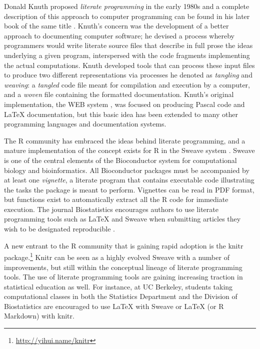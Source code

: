 \documentclass[11pt,oneside,english]{article}
\begin{document}
Donald Knuth proposed \emph{literate programming} in the early 1980s and a
complete description of this approach to computer programming can be found in
his later book of the same title \cite{Knuth92}.  Knuth's concern was the
development of a better approach to documenting computer software; he devised a
process whereby programmers would write literate source files that describe in
full prose the ideas underlying a given program, interspersed with the code
fragments implementing the actual computations.  Knuth developed tools that can
process these input files to produce two different representations via
processes he denoted as \emph{tangling} and \emph{weaving}: a \emph{tangled}
code file meant for compilation and execution by a computer, and a \emph{woven}
file containing the formatted documentation.  Knuth's original implementation,
the WEB system \cite{Knuth:1983:WSS}, was focused on producing Pascal code and
\LaTeX{} documentation, but this basic idea has been extended to many other
programming languages and documentation systems.  

The R community has embraced the ideas behind literate programming,
and a mature implementation of the concept exists for R in the Sweave system
\cite{lmucs-papers:Leisch:2002}.  Sweave is one of the central elements of the
Bioconductor system \cite{Gentleman2004, Dudoit2003} for computational biology
and bioinformatics.  All Bioconductor packages must be accompanied by at least
one \emph{vignette}, a literate program that contains executable
code illustrating the tasks the package is meant to perform.  Vignettes can be
read in PDF format, but functions exist to automatically extract all the R code
for immediate execution.  The journal Biostatistics encourages authors to use
literate programming tools such as \LaTeX{} and Sweave when submitting articles
they wish to be designated reproducible \cite{Peng01072009}.

A new entrant to the R community that is gaining rapid adoption is the knitr
package.\footnote{\url{http://yihui.name/knitr}}  Knitr can be seen as a highly
evolved Sweave with a number of improvements, but still within the conceptual
lineage of literate programming tools.  The use of literate programming tools
are gaining increasing traction in statistical education as well.  For
instance, at UC Berkeley, students taking computational classes in both the
Statistics Department and the Division of Biostatistics are
encouraged to use \LaTeX{} with Sweave or \LaTeX{} (or R Markdown) with knitr.
\end{document}
